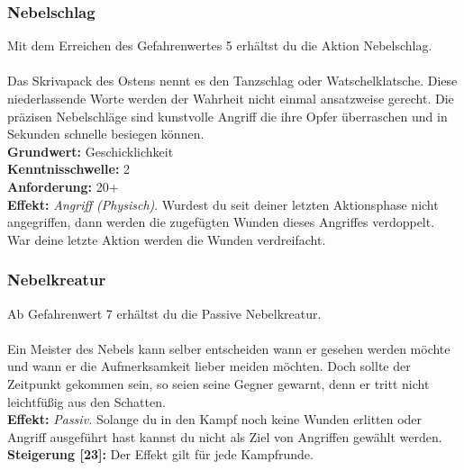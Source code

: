 \subsubsection*{ Nebelschlag} \label{sk:nebelschlag}
Mit dem Erreichen des Gefahrenwertes 5 erhältst du die Aktion Nebelschlag.\\
\\
Das Skrivapack des Ostens nennt es den Tanzschlag oder Watschelklatsche. Diese niederlassende Worte werden der Wahrheit nicht einmal ansatzweise gerecht. Die präzisen Nebelschläge sind kunstvolle Angriff die ihre Opfer überraschen und in Sekunden schnelle besiegen können.\\
\textbf{Grundwert:} Geschicklichkeit \\
\textbf{Kenntnisschwelle:} 2 \\
\textbf{Anforderung:} 20+ \\
\textbf{Effekt:} \textit{Angriff (Physisch)}. Wurdest du seit deiner letzten Aktionsphase nicht angegriffen, dann werden die zugefügten Wunden dieses Angriffes verdoppelt. War deine letzte Aktion  werden die Wunden verdreifacht.

\subsubsection*{ Nebelkreatur} \label{sk:nebelkreatur}
Ab Gefahrenwert 7 erhältst du die Passive Nebelkreatur.\\
\\
Ein Meister des Nebels kann selber entscheiden wann er gesehen werden möchte und wann er die Aufmerksamkeit lieber meiden möchten. Doch sollte der Zeitpunkt gekommen sein, so seien seine Gegner gewarnt, denn er tritt nicht leichtfüßig aus den Schatten.\\
\textbf{Effekt:} \textit{Passiv.} Solange du in den Kampf noch keine Wunden erlitten oder Angriff ausgeführt hast kannst du nicht als Ziel von Angriffen gewählt werden.\\
\textbf{Steigerung [23]:} Der Effekt gilt für jede Kampfrunde.

